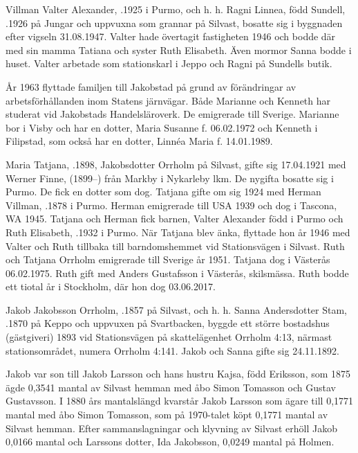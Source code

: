 Villman Valter Alexander, .1925  i Purmo, och h. h. Ragni Linnea, född Sundell, .1926 på Jungar och uppvuxna som grannar på Silvast, bosatte sig i byggnaden efter vigseln 31.08.1947. Valter hade övertagit fastigheten 1946 och bodde där med sin mamma Tatiana och syster Ruth Elisabeth. Även mormor Sanna bodde i huset. Valter arbetade som stationskarl i Jeppo och Ragni på Sundells butik.
\begin{jhchildren}
  \item {}
  \item {}
\end{jhchildren}
År 1963 flyttade familjen till Jakobstad på grund av förändringar av arbetsförhållanden inom Statens järnvägar. Både Marianne och Kenneth har studerat vid Jakobstads Handelsläroverk. De emigrerade till Sverige. Marianne bor i Visby och har en dotter, Maria Susanne f. 06.02.1972 och Kenneth i Filipstad, som också har en dotter, Linnéa Maria f. 14.01.1989.

Maria Tatjana, .1898, Jakobsdotter Orrholm på Silvast, gifte sig 17.04.1921 med Werner Finne, (1899--) från Markby i Nykarleby lkm. De nygifta bosatte sig i Purmo. De fick en dotter som dog. Tatjana gifte om sig 1924 med Herman Villman, .1878 i Purmo. Herman emigrerade till USA 1939 och dog i Tascona, WA 1945. Tatjana och Herman fick barnen, Valter Alexander född i Purmo och Ruth Elisabeth, .1932 i Purmo. När Tatjana blev änka, flyttade hon år 1946 med Valter och Ruth tillbaka till barndomshemmet vid Stationsvägen i Silvast. Ruth och Tatjana Orrholm emigrerade till Sverige år 1951. Tatjana dog i Västerås 06.02.1975. Ruth gift med Anders Gustafsson i Västerås, skilsmässa. Ruth bodde ett tiotal år i Stockholm, där hon dog 03.06.2017.


Jakob Jakobsson Orrholm, .1857 på Silvast, och h. h. Sanna Andersdotter Stam, .1870 på Keppo och uppvuxen på Svartbacken, byggde ett större bostadshus (gästgiveri) 1893 vid Stationsvägen på skattelägenhet Orrholm 4:13, närmast stationsområdet, numera Orrholm 4:141. Jakob och Sanna gifte sig 24.11.1892.

Jakob var son till Jakob Larsson och hans hustru Kajsa, född Eriksson, som 1875 ägde 0,3541 mantal av Silvast hemman med åbo Simon Tomasson och Gustav Gustavsson. I 1880 års mantalslängd kvarstår Jakob Larsson som ägare till 0,1771 mantal med åbo Simon Tomasson, som på 1970-talet köpt 0,1771 mantal av Silvast hemman. Efter sammanslagningar och klyvning av Silvast erhöll Jakob 0,0166 mantal och Larssons dotter, Ida Jakobsson, 0,0249 mantal på Holmen.

